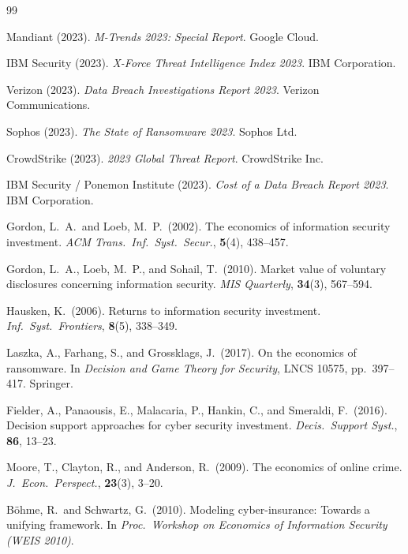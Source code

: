 \documentclass[12pt,a4paper]{article}
\theoremstyle{plain}
\theoremstyle{definition}
\theoremstyle{remark}
\begin{document}
\clearpage
\begin{thebibliography}{99}

Mandiant (2023).
\textit{M-Trends 2023: Special Report}.
Google Cloud.

IBM Security (2023).
\textit{X-Force Threat Intelligence Index 2023}.
IBM Corporation.

Verizon (2023).
\textit{Data Breach Investigations Report 2023}.
Verizon Communications.

Sophos (2023).
\textit{The State of Ransomware 2023}.
Sophos Ltd.

CrowdStrike (2023).
\textit{2023 Global Threat Report}.
CrowdStrike Inc.

IBM Security / Ponemon Institute (2023).
\textit{Cost of a Data Breach Report 2023}.
IBM Corporation.

Gordon, L.\ A.\ and Loeb, M.\ P.\ (2002).
The economics of information security investment.
\textit{ACM Trans.\ Inf.\ Syst.\ Secur.}, \textbf{5}(4), 438--457.

Gordon, L.\ A., Loeb, M.\ P., and Sohail, T.\ (2010).
Market value of voluntary disclosures concerning information security.
\textit{MIS Quarterly}, \textbf{34}(3), 567--594.

Hausken, K.\ (2006).
Returns to information security investment.
\textit{Inf.\ Syst.\ Frontiers}, \textbf{8}(5), 338--349.

Laszka, A., Farhang, S., and Grossklags, J.\ (2017).
On the economics of ransomware.
In \textit{Decision and Game Theory for Security},
LNCS 10575, pp.~397--417.
Springer.

Fielder, A., Panaousis, E., Malacaria, P., Hankin, C., and Smeraldi, F.\ (2016).
Decision support approaches for cyber security investment.
\textit{Decis.\ Support Syst.}, \textbf{86}, 13--23.

Moore, T., Clayton, R., and Anderson, R.\ (2009).
The economics of online crime.
\textit{J.\ Econ.\ Perspect.}, \textbf{23}(3), 3--20.

B{\"o}hme, R.\ and Schwartz, G.\ (2010).
Modeling cyber-insurance: Towards a unifying framework.
In \textit{Proc.\ Workshop on Economics of Information Security (WEIS 2010)}.


\end{thebibliography}
\end{document}
